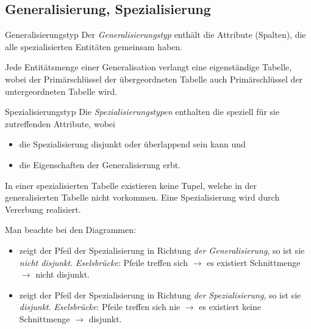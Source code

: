 \subsection{Generalisierung, Spezialisierung}

\begin{defi}{Generalisierungstyp}
    Der \emph{Generalisierungstyp} enthält die Attribute (Spalten), die alle spezialisierten Entitäten gemeinsam haben.

    Jede Entitätsmenge einer Generalisation verlangt eine eigenständige Tabelle, wobei der Primärschlüssel der übergeordneten Tabelle auch Primärschlüssel der untergeordneten Tabelle wird.

\end{defi}

\begin{defi}{Spezialisierungstyp}
    Die \emph{Spezialisierungstypen} enthalten die speziell für sie zutreffenden Attribute, wobei
    \begin{itemize}
        \item die Spezialisierung disjunkt oder überlappend sein kann und
        \item die Eigenschaften der Generalisierung erbt.
    \end{itemize}

    In einer spezialisierten Tabelle existieren keine Tupel, welche in der generalisierten Tabelle nicht vorkommen.
    Eine Spezialisierung wird durch Vererbung realisiert.

    Man beachte bei den Diagrammen:
    \begin{itemize}
        \item zeigt der Pfeil der Spezialisierung in Richtung \emph{der Generalisierung}, so ist sie \emph{nicht disjunkt}.
              \subitem \emph{Eselsbrücke}: Pfeile treffen sich $\to$ es existiert Schnittmenge $\to$ nicht disjunkt.
        \item zeigt der Pfeil der Spezialisierung in Richtung \emph{der Spezialisierung}, so ist sie \emph{disjunkt}.
              \subitem \emph{Eselsbrücke}: Pfeile treffen sich nie $\to$ es existiert keine Schnittmenge $\to$ disjunkt.
    \end{itemize}


\end{defi}
